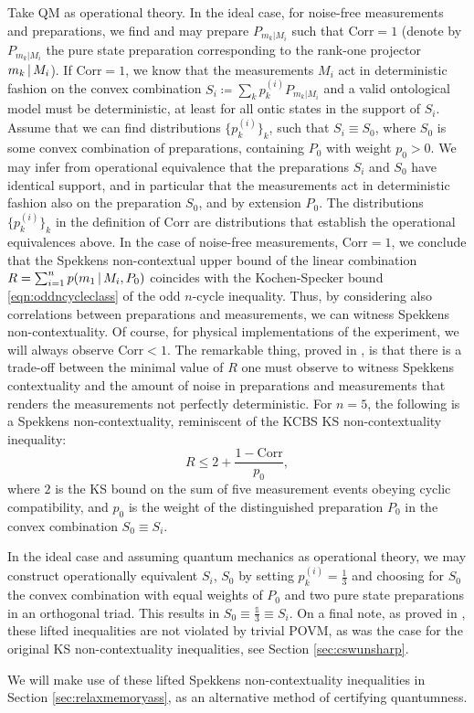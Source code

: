 Take QM as operational theory. In the ideal case, for noise-free measurements and preparations, we find and may prepare $P_{m_k\vert M_i}$ such that $\text{Corr}=1$ (denote by $P_{m_k\vert M_i}$ the pure state preparation corresponding to the rank-one projector $m_k\thinspace\vert\thinspace M_i$). If $\text{Corr}=1$, we know that the measurements $M_i$ act in deterministic fashion on the convex combination $S_i \coloneqq \sum_k p_k^{(i)} P_{m_k\vert M_i}$ and a valid ontological model must be deterministic, at least for all ontic states in the support of $S_i$. Assume that we can find distributions $\{p_k^{(i)}\}_k$, such that $S_i\equiv S_0$, where $S_0$ is some convex combination of preparations, containing $P_0$ with weight $p_0>0$. We may infer from operational equivalence that the preparations $S_i$ and $S_0$ have identical support, and in particular that the measurements act in deterministic fashion also on the preparation $S_0$, and by extension $P_0$. The distributions $\{p_k^{(i)}\}_k$ in the definition of $\text{Corr}$ are distributions that establish the operational equivalences above. In the case of noise-free measurements, $\text{Corr}=1$, we conclude that the Spekkens non-contextual upper bound of the linear combination $R=\sum_{i=1}^n p(m_1\thinspace\vert\thinspace M_i,P_0)$ coincides with the Kochen-Specker bound \ref{eqn:oddncycleclass} of the odd $n$-cycle inequality. Thus, by considering also correlations between preparations and measurements, we can witness Spekkens non-contextuality. Of course, for physical implementations of the experiment, we will always observe $\text{Corr}<1$. The remarkable thing, proved in \cite{Kunjwal2019}, is that there is a trade-off between the minimal value of $R$ one must observe to witness Spekkens contextuality and the amount of noise in preparations and measurements that renders the measurements not perfectly deterministic. For $n=5$, the following is a Spekkens non-contextuality, reminiscent of the KCBS KS non-contextuality inequality:
\begin{equation}
R\leq 2+\frac{1-\text{Corr}}{p_0},
\end{equation}
where $2$ is the KS bound on the sum of five measurement events obeying cyclic compatibility, and $p_0$ is the weight of the distinguished preparation $P_0$ in the convex combination $S_0\equiv S_i$.

In the ideal case and assuming quantum mechanics as operational theory, we may construct operationally equivalent $S_i$, $S_0$ by setting $p_k^{(i)}=\frac{1}{3}$ and choosing for $S_0$ the convex combination with equal weights of $P_0$ and two pure state preparations in an orthogonal triad. This results in $S_0 \equiv \frac{\mathbb{1}}{3} \equiv S_i$.
On a final note, as proved in \cite{Kunjwal2019}, these lifted inequalities are not violated by trivial POVM, as was the case for the original KS non-contextuality inequalities, see Section \ref{sec:cswunsharp}.

We will make use of these lifted Spekkens non-contextuality inequalities in Section \ref{sec:relaxmemoryass}, as an alternative method of certifying quantumness.